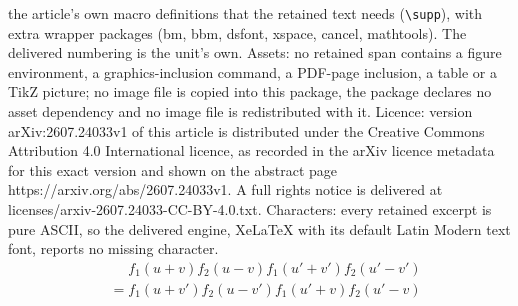 \documentclass[10pt,a4paper]{amsart}
\begin{document}
the article's own macro definitions that the retained text needs (\texttt{\textbackslash supp}), with extra wrapper packages (bm, bbm, dsfont, xspace, cancel, mathtools). The delivered numbering is the unit's own. Assets: no retained span contains a figure environment, a graphics-inclusion command, a PDF-page inclusion, a table or a TikZ picture; no image file is copied into this package, the package declares no asset dependency and no image file is redistributed with it. Licence: version arXiv:2607.24033v1 of this article is distributed under the Creative Commons Attribution 4.0 International licence, as recorded in the arXiv licence metadata for this exact version and shown on the abstract page https://arxiv.org/abs/2607.24033v1. A full rights notice is delivered at licenses/arxiv-2607.24033-CC-BY-4.0.txt. Characters: every retained excerpt is pure ASCII, so the delivered engine, XeLaTeX with its default Latin Modern text font, reports no missing character.
\begin{align}
  & \phantom{ {} = {} }  f_1 ( u + v ) f_2 ( u - v ) f_1 ( u' + v' ) f_2 ( u' - v' ) \\
  & = f_1 ( u + v' ) f_2 ( u - v' ) f_1 ( u' + v ) f_2 ( u' - v ) \label{eq:complex-Kac-Bernstein}
\end{align}
\end{document}
